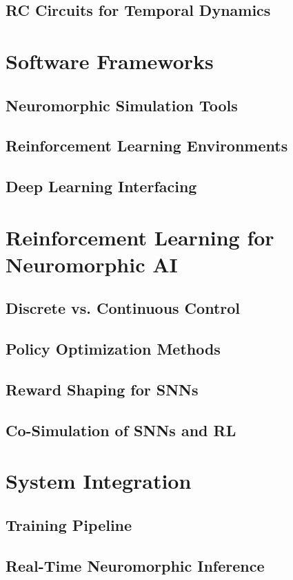 \section{RC Circuits for Temporal Dynamics}

\chapter{Software Frameworks}
\section{Neuromorphic Simulation Tools}
\section{Reinforcement Learning Environments}
\section{Deep Learning Interfacing}

\chapter{Reinforcement Learning for Neuromorphic AI}
\section{Discrete vs. Continuous Control}
\section{Policy Optimization Methods}
\section{Reward Shaping for SNNs}
\section{Co-Simulation of SNNs and RL}

\chapter{System Integration}
\section{Training Pipeline}
\section{Real-Time Neuromorphic Inference}

